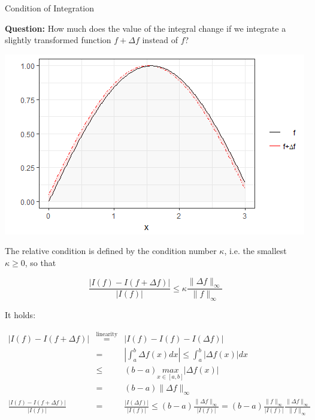 \documentclass[11pt,compress,t,notes=noshow, xcolor=table]{beamer}
\begin{document}
\begin{vbframe}{Condition of Integration}

\textbf{Question:} How much does the value of the integral change if we integrate a slightly transformed function $f + \Delta f$ instead of $f$?

\vspace*{-0.2cm}
\begin{center}
\includegraphics[width = .8\textwidth]{figure_man/konditionquadratur.png}
\end{center}

\framebreak

The relative condition is defined by the condition number $\kappa$, i.e. the smallest $\kappa \ge 0$, so that

$$
\frac{|I(f) - I(f + \Delta f)|}{|I(f)|} \le \kappa \frac{\|\Delta f\|_\infty}{\|f\|_\infty}
$$

It holds:

\vspace*{-0.5cm}
{\footnotesize
\begin{eqnarray*}
|I(f) - I(f + \Delta f)| &\overset{\text{linearity}}{=}& |I(f) - I(f) - I(\Delta f)| \\
  &=& \left| \int_a^b \Delta f(x)dx \right| \leq \int_a^b |\Delta f(x)|dx \\
  &\leq& (b - a) \underset{x \in [a, b]}{max}|\Delta f(x)| \\
  &=& (b - a) \| \Delta f \|_{\infty} \\[0.3cm]
\frac{|I(f) - I(f + \Delta f)|}{|I(f)|} &=& \frac{|I(\Delta f)|}{|I(f)|} \le (b - a) \frac{\|\Delta f\|_\infty}{|I(f)|} = (b - a) \frac{\|f\|_\infty}{|I(f)|} \frac{\|\Delta f\|_\infty}{\|f\|_\infty}
\end{eqnarray*}
}


\end{vbframe}
\end{document}
